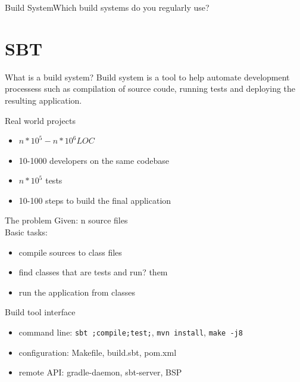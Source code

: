 \documentclass[aspectratio=169]{beamer}
\begin{document}
\begin{frame}{Build System}{Which build systems do you regularly use?}
\begin{figure}[htpb]
  \begin{center}
  \end{center}
\end{figure}
\end{frame}

\section{SBT}

\begin{frame}{What is a build system?}
  Build system is a tool to help automate development processess such as compilation of source
  coude, running tests and deploying the resulting application.
\end{frame}

\begin{frame}{Real world projects}
  \begin{itemize}
    \item $n*10^5 - n*10^6 LOC$
    \item 10-1000 developers on the same codebase
    \item $n*10^5$ tests
    \item 10-100 steps to build the final application
  \end{itemize}
\end{frame}

\begin{frame}{The problem}
  Given: n source files \\
  Basic tasks:
  \begin{itemize}
    \item compile sources to class files
    \item find classes that are tests and run? them
    \item run the application from classes
  \end{itemize}
\end{frame}

\begin{frame}{Build tool interface}
\begin{itemize}
  \item command line: \texttt{sbt ;compile;test;}, \texttt{mvn install}, \texttt{make -j8}
  \item configuration: Makefile, build.sbt, pom.xml
  \item remote API: gradle-daemon, sbt-server, BSP
\end{itemize}
\end{frame}
\end{document}
